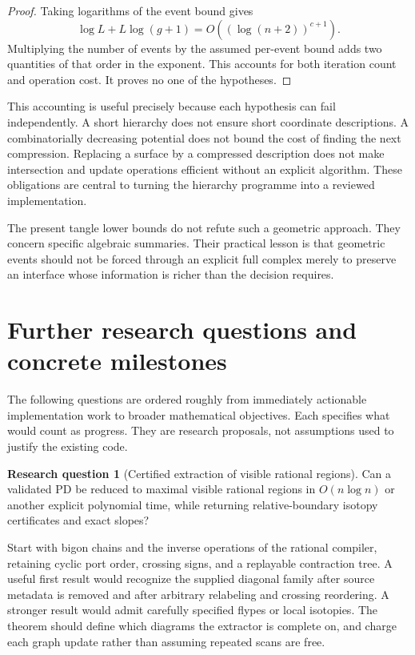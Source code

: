 \documentclass[11pt,a4paper]{article}
\theoremstyle{definition}
\newtheorem{researchquestion}{Research question}
\theoremstyle{remark}
\numberwithin{equation}{section}
\begin{document}
\begin{proof}
Taking logarithms of the event bound gives
\[
 \log L+L\log(g+1)
 =O((\log(n+2))^{c+1}).
\]
Multiplying the number of events by the assumed per-event bound adds
two quantities of that order in the exponent. This accounts for both
iteration count and operation cost. It proves no one of the hypotheses.
\end{proof}

This accounting is useful precisely because each hypothesis can fail
independently. A short hierarchy does not ensure short coordinate
descriptions. A combinatorially decreasing potential does not bound the
cost of finding the next compression. Replacing a surface by a compressed
description does not make intersection and update operations efficient
without an explicit algorithm. These obligations are central to turning
the hierarchy programme into a reviewed implementation.

The present tangle lower bounds do not refute such a geometric approach.
They concern specific algebraic summaries. Their practical lesson is
that geometric events should not be forced through an explicit full
complex merely to preserve an interface whose information is richer
than the decision requires.

\section{Further research questions and concrete milestones}
\label{sec:questions}

The following questions are ordered roughly from immediately actionable
implementation work to broader mathematical objectives. Each specifies
what would count as progress. They are research proposals, not assumptions
used to justify the existing code.

\begin{researchquestion}[Certified extraction of visible rational regions]
Can a validated PD be reduced to maximal visible rational regions in
\(O(n\log n)\) or another explicit polynomial time, while returning
relative-boundary isotopy certificates and exact slopes?
\end{researchquestion}
Start with bigon chains and the inverse operations of the rational compiler,
retaining cyclic port order, crossing signs, and a replayable contraction
tree. A useful first result would recognize the supplied diagonal family
after source metadata is removed and after arbitrary relabeling and
crossing reordering. A stronger result would admit carefully specified
flypes or local isotopies. The theorem should define which diagrams
the extractor is complete on, and charge each graph update rather than
assuming repeated scans are free.
\end{document}
